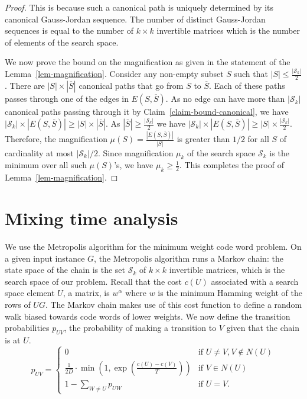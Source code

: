 \documentclass{sig-alternate-2013}
\begin{document}
\begin{proof}
  This is because such a canonical path is uniquely determined by
  its canonical Gauss-Jordan sequence. The number of distinct Gauss-Jordan
  sequences is equal to the number of $k\times k$ invertible matrices
  which is the number of elements of the search space.

  We now prove the bound on the magnification as given in the
  statement of the Lemma~\ref{lem-magnification}. Consider any
  non-empty subset $S$ such that $|S| \leq \frac{|
    \mathcal{S}_k|}{2}$.  There are $|S| \times |\overline{S}|$
  canonical paths that go from $S$ to $\overline{S}$.  Each of these
  paths passes through one of the edges in $E(S,\overline{S})$. As no
  edge can have more than $ |\mathcal{S}_k|$ canonical paths passing
  through it by Claim~\ref{claim-bound-canonical}, we have $
  |\mathcal{S}_k| \times | E(S, \overline{S})| \geq |S| \times
  |\overline{S}|$.  As $| \overline{S}| \geq
  \frac{|\mathcal{S}_k|}{2}$ we have $| \mathcal{S}_k| \times | E(S,
  \overline{S})| \geq | S| \times
  \frac{|\mathcal{S}_k|}{2}$. Therefore, the magnification $\mu (S) =
  \frac{|E(S,\overline{S})|}{|S|}$ is greater than $1/2$ for all $S$
  of cardinality at most $|\mathcal{S}_k|/2$. Since magnification
  $\mu_k$ of the search space $\mathcal{S}_k$ is the minimum over all
  such $\mu(S)$'s, we have $\mu_k \geq \frac{1}{2}$. This completes
  the proof of Lemma~\ref{lem-magnification}.
\end{proof}


\section{Mixing time analysis}

We use the Metropolis algorithm for the minimum weight code word
problem. On a given input instance $G$, the Metropolis algorithm runs
a Markov chain: the state space of the chain is the set
$\mathcal{S}_k$ of $k\times k$ invertible matrices, which is the search
space of our problem. Recall that the cost $c(U)$ associated with a
search space element $U$, a matrix, is $w^\alpha$ where $w$ is the
minimum Hamming weight of the rows of $UG$. The Markov chain makes use
of this cost function to define a random walk biased towards code
words of lower weights. We now define the transition probabilities
$p_{UV}$, the probability of making a transition to $V$ given that the
chain is at $U$.
\[
p_{UV} = 
\begin{cases}
  0  & \textrm{if }U \neq V, V \notin N(U) \\
  \frac{1}{2D}\cdot \min
  \left(1,
    \exp\left({\frac{c(U)-c(V)}{T}}\right)
  \right) & \textrm{if }V \in N(U)\\
    1 - \sum_{W\neq U} p_{UW}      &  \textrm {if }U = V.
\end{cases}
\]
\end{document}
